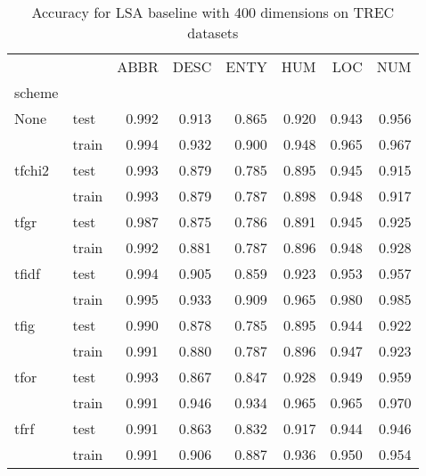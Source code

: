\begin{table}[H]
\begin{center}

\begin{tabular}{llrrrrrr}
\toprule
{} &  &  ABBR &  DESC &  ENTY &  HUM &  LOC &  NUM \\
scheme &  &       &       &       &      &      &      \\
\midrule
None & test &     0.992 &     0.913 &     0.865 &    0.920 &    0.943 &    0.956 \\
{} & train &     0.994 &     0.932 &     0.900 &    0.948 &    0.965 &    0.967 \\
tfchi2 & test &     0.993 &     0.879 &     0.785 &    0.895 &    0.945 &    0.915 \\
{} & train &     0.993 &     0.879 &     0.787 &    0.898 &    0.948 &    0.917 \\
tfgr & test &     0.987 &     0.875 &     0.786 &    0.891 &    0.945 &    0.925 \\
{} & train &     0.992 &     0.881 &     0.787 &    0.896 &    0.948 &    0.928 \\
tfidf & test &     0.994 &     0.905 &     0.859 &    0.923 &    0.953 &    0.957 \\
{} & train &     0.995 &     0.933 &     0.909 &    0.965 &    0.980 &    0.985 \\
tfig & test &     0.990 &     0.878 &     0.785 &    0.895 &    0.944 &    0.922 \\
{} & train &     0.991 &     0.880 &     0.787 &    0.896 &    0.947 &    0.923 \\
tfor & test &     0.993 &     0.867 &     0.847 &    0.928 &    0.949 &    0.959 \\
{} & train &     0.991 &     0.946 &     0.934 &    0.965 &    0.965 &    0.970 \\
tfrf & test &     0.991 &     0.863 &     0.832 &    0.917 &    0.944 &    0.946 \\
{} & train &     0.991 &     0.906 &     0.887 &    0.936 &    0.950 &    0.954 \\
\bottomrule
\end{tabular}

\caption[Accuracy for LSA baseline with 400 dimensions on TREC datasets]{Accuracy for LSA baseline with 400 dimensions on TREC datasets}
\label{tab:lsa:resuts:abs:400:TREC}
\end{center}
\end{table}





